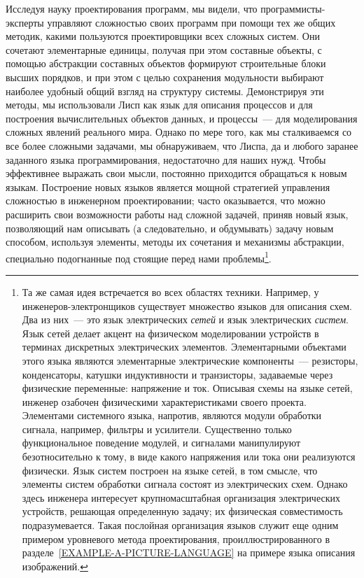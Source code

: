 Исследуя науку проектирования программ, мы видели,
что программисты-эксперты управляют сложностью своих программ при
помощи тех же общих методик, какими пользуются проектировщики всех
сложных систем.  Они сочетают элементарные единицы, получая при этом
составные объекты, с помощью абстракции составных объектов формируют
строительные блоки высших порядков, и при этом с целью сохранения
модульности выбирают наиболее удобный общий взгляд на структуру
системы.  Демонстрируя эти методы, мы использовали Лисп как язык для
описания процессов и для построения вычислительных объектов данных, и
процессы~--- для моделирования сложных явлений реального мира.  Однако по
мере того, как мы сталкиваемся со все более сложными задачами, мы
обнаруживаем, что Лиспа, да и любого заранее заданного языка
программирования, недостаточно для наших нужд. Чтобы эффективнее
выражать свои мысли, постоянно приходится обращаться к новым
языкам.  Построение новых языков является мощной стратегией управления
сложностью в инженерном проектировании; часто оказывается, что можно
расширить свои возможности работы над сложной задачей, приняв новый
язык,  позволяющий нам описывать (а следовательно, и обдумывать)
задачу новым способом, используя элементы, методы их сочетания и
механизмы абстракции, специально подогнанные под стоящие перед нами
проблемы\footnote{Та же самая идея встречается во всех областях техники.
Например, у инженеров-элек\-т\-рон\-щи\-ков существует множество языков для
описания схем.  Два из них~--- это язык электрических
{\em сетей} и язык электрических {\em систем}.  Язык
сетей делает акцент на физическом моделировании устройств в терминах
дискретных электрических элементов.  Элементарными объектами этого
языка являются элементарные электрические компоненты~--- резисторы,
конденсаторы, катушки индуктивности и транзисторы, задаваемые через
физические переменные: напряжение и ток.  Описывая схемы на языке
сетей, инженер озабочен физическими характеристиками своего проекта.
Элементами системного языка, напротив, являются модули обработки
сигнала, например, фильтры и усилители.  Существенно только
функциональное поведение модулей, и сигналами манипулируют безотносительно
к тому, в виде какого напряжения или тока они реализуются физически.
Язык систем построен на языке сетей, в том смысле, что элементы систем
обработки сигнала состоят из электрических схем.  Однако здесь
инженера интересует крупномасштабная организация электрических
устройств, решающая определенную задачу; их физическая совместимость
подразумевается.  Такая послойная организация языков служит еще одним
примером уровневого метода проектирования, проиллюстрированного в
разделе~\ref{EXAMPLE-A-PICTURE-LANGUAGE} на примере языка
описания изображений.}.

